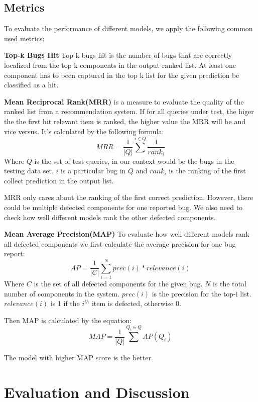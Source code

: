 \subsection{Metrics}
To evaluate the performance of different models, we apply the following common used metrics:

\textbf{Top-k Bugs Hit}
Top-k bugs hit is the number of bugs that are correctly localized from the top k components in the output ranked list. 
At least one component has to been captured in the top k list for the given prediction be classified as a hit.

\textbf{Mean Reciprocal Rank(MRR)} is a measure to evaluate the quality of the ranked list from a recommendation system. 
If for all queries under test, the higer the the first hit relevant item is ranked, the higher value the MRR will be and vice versus. 
It's calculated by the following formula:
\begin{equation}
MRR = \frac{1}{|Q|}\sum^{i \in Q}\frac{1}{rank_i}
\end{equation} 
Where $Q$ is the set of test queries, in our context would be the bugs in the testing data set. 
$i$ is a particular bug in $Q$ and $rank_i$ is the ranking of the first collect prediction in the output list.

MRR only cares about the ranking of the first correct prediction. 
However, there could be multiple defected components for one reported bug. 
We also need to check how well different models rank the other defected components.

\textbf{Mean Average Precision(MAP)} To evaluate how well different models rank all defected components we first calculate the average precision for one bug report:
 \begin{equation}
 	AP=\frac{1}{|C|} \sum_{i=1}^{N}prec(i)*relevance(i)
 \end{equation}
Where $C$ is the set of all defected components for the given bug. 
$N$ is the total number of components in the system.  
$prec(i)$ is the precision for the top-i list.
$relevance(i)$ is 1 if the $i^{th}$ item is defected, otherwise $0$.

Then MAP is calculated by the equation:
\begin{equation}
	MAP = \frac{1}{|Q|}\sum^{Q_i \in Q}AP(Q_i)
\end{equation} 

The model with higher MAP score is the better.
\section{Evaluation and Discussion}

